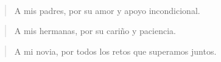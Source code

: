 \thispagestyle{empty}
\newenvironment{dedication} {\cleardoublepage
\thispagestyle{empty}
\vspace*{\stretch{1}} \begin{center} \em} {\end{center}
\vspace*{\stretch{3}} \clearpage}
\begin{dedication}
\hfill \
\parbox{12cm}{
\begin{verse}
A mis padres,\newline
por su amor y apoyo incondicional.
\end{verse}

\begin{verse}
A mis hermanas,\newline
por su cari\~{n}o y paciencia.
\end{verse}


\begin{verse}
A mi novia,\newline
por todos los retos que superamos juntos.
\end{verse}
}
\end{dedication}

\newpage
$\ $
\thispagestyle{empty} %